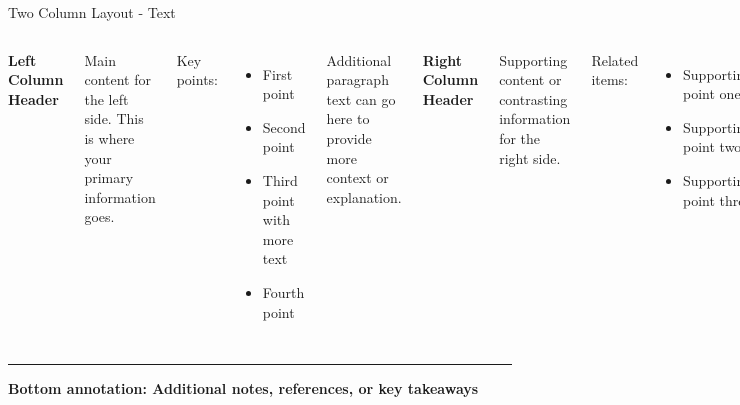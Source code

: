 \documentclass[8pt,aspectratio=169]{beamer}
\newcommand{\bottomnote}[1]{%
\vfill
\vspace{-2mm}
\textcolor{mllavender2}{\rule{\textwidth}{0.4pt}}
\vspace{1mm}
\footnotesize
\textbf{#1}
}
\begin{document}
\begin{frame}[t]{Two Column Layout - Text}
\begin{columns}[T]
\textbf{Left Column Header}

Main content for the left side. This is where your primary information goes.

Key points:
\begin{itemize}
\item First point
\item Second point
\item Third point with more text
\item Fourth point
\end{itemize}

Additional paragraph text can go here to provide more context or explanation.

\textbf{Right Column Header}

Supporting content or contrasting information for the right side.

Related items:
\begin{itemize}
\item Supporting point one
\item Supporting point two
\item Supporting point three
\end{itemize}

More descriptive text that complements the left column content.
\end{columns}

\bottomnote{Bottom annotation: Additional notes, references, or key takeaways}
\end{frame}
\end{document}

